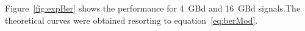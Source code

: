 \begin{refsection}
%

Figure~\ref{fig:expBer} shows the performance for 4~GBd and 16~GBd signals.The 
theoretical curves were obtained resorting to equation~\ref{eq:berMod}.


\end{refsection}
